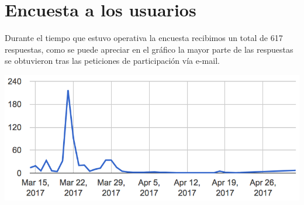 \section{Encuesta a los usuarios}

Durante el tiempo que estuvo operativa la encuesta recibimos un total de 617 respuestas, como se puede apreciar en el gráfico la mayor parte de las respuestas se obtuvieron tras las peticiones de participación vía e-mail.

    \includegraphics[width=1.0\textwidth]{../charts/00_fecha}


